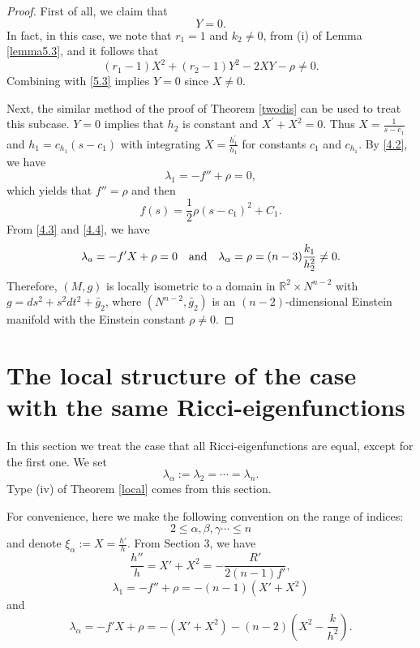 \documentclass{amsart}
\theoremstyle{definition}
\theoremstyle{remark}
\numberwithin{equation}{section}
\begin{document}
\begin{proof} 
First of all, we claim that 
\[
Y=0.
\]
In fact, in this case, we note that $r_1=1$ and $k_2\neq0$,
from (i) of Lemma \ref{lemma5.3}, and it follows that
	\[
	(r_1-1)X^2+(r_2-1)Y^2-2XY-\rho \neq 0.
\]
Combining with \eqref{5.3} implies $Y=0$ since $X\neq0$.

Next, the similar method of the proof of Theorem \ref{twodis} can be used to treat
this subcase. 
	$Y=0$ implies that $h_2$ is constant and $X^{'} + X^2=0$. Thus $X= \frac{1}{s-c_1}$ and 
	$h_1= c_{h_1} (s-c_1)$ with integrating $X= \frac{h^{'}_1}{h_1}$ for constants $c_1$ and $c_{h_1}$.
	By \eqref{4.2}, we have
	\[
	\lambda_1=-f''+\rho=0,
	\]
	which yields that $f''=\rho$ and then
	\[
	f(s) = \frac{1}{2} \rho (s-c_1)^2+C_1.
	\]
From \eqref{4.3} and \eqref{4.4}, we have 
	\[
		\lambda_a=-f'X+\rho=0 \quad {\rm and } \quad
	\lambda_\alpha=\rho=(n-3)\frac{k_1}{h^2_2}\neq0.
	\]
	Therefore, $(M,g)$ is locally isometric to a domain in 
	$\mathbb{R}^{2}\times N^{n-2}$
	with $g= ds^2 + s^2dt^2+\tilde{g_2}$,
	where $\left(N^{n-2}, \tilde{g_2}\right)$ 
	is an $(n-2)$-dimensional Einstein manifold
	with the Einstein constant $\rho\neq 0$.	
\end{proof}

	\section
	{The local structure of the case with the same Ricci-eigenfunctions}
	
	In this section we treat the case that all Ricci-eigenfunctions are equal, except for the first one.
	We set
	\[
	\lambda_{\alpha}:=\lambda_{2}= \cdots= \lambda_{n}.
	\]
	Type {\rm (iv)} of Theorem \ref{local} comes from this section.
	
	\smallskip
	For convenience, here we make the following convention on the range of indices:
	\[
	2 \leq \alpha, \beta, \gamma \cdots\leq n\]
	and denote $\xi_\alpha:=X=\frac{h'}{h}$.
	From Section 3, we have
	\begin{equation}\label{6.1}
	\frac{h''}{h}=X'+X^2=-\frac{R'}{2(n-1)f'},
	\end{equation}
	\begin{equation}\label{6.2}
	\lambda_{1}=-f''+\rho=-(n-1)\left( X'+X^2 \right)
	\end{equation}
	and
	\begin{equation}\label{6.3}
	\lambda_{\alpha}=-f'X+\rho=-\left( X'+X^2 \right)-(n-2)\left( X^2-\frac{k}{h^2} \right). 
	\end{equation}
	
\end{document}
